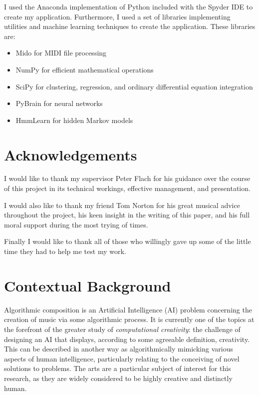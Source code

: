 \documentclass[ author={Stephen Livermore-Tozer},
				supervisor={Dr. Peter Flach},
				degree={MEng},
				title={Algorithmic Co-composition Using Machine Learning},
				subtitle={},
				type={research},
				year={2016} ]{dissertation}
\begin{document}
	I used the Anaconda implementation of Python included with the Spyder IDE to create my application. Furthermore, I used a set of libraries implementing utilities and machine learning techniques to create the application. These libraries are: 
	
	\begin{itemize}
		\item Mido for MIDI file processing
		\item NumPy for efficient mathematical operations
		\item SciPy for clustering, regression, and ordinary differential equation integration
		\item PyBrain for neural networks
		\item HmmLearn for hidden Markov models
	\end{itemize}
	
	
	\chapter*{Acknowledgements}
	
	I would like to thank my supervisor Peter Flach for his guidance over the course of this project in its technical workings, effective management, and presentation. 
	
	I would also like to thank my friend Tom Norton for his great musical advice throughout the project, his keen insight in the writing of this paper, and his full moral support during the most trying of times.
	
	Finally I would like to thank all of those who willingly gave up some of the little time they had to help me test my work. 
	
	\mainmatter
	
	
	\chapter{Contextual Background}
	\label{chap:context}
	
	Algorithmic composition is an Artificial Intelligence (AI) problem concerning the creation of music via some algorithmic process. It is currently one of the topics at the forefront of the greater study of \textit{computational creativity}: the challenge of designing an AI that displays, according to some agreeable definition, creativity. This can be described in another way as algorithmically mimicking various aspects of human intelligence, particularly relating to the conceiving of novel solutions to problems. The arts are a particular subject of interest for this research, as they are widely considered to be highly creative and distinctly human.
	
\end{document}
